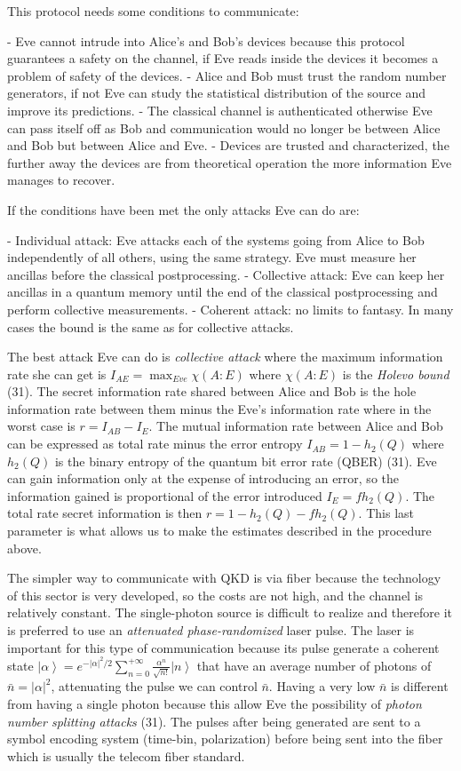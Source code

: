 This protocol needs some conditions to communicate:

- Eve cannot intrude into Alice’s and Bob’s devices because this protocol guarantees a safety on the channel, if Eve reads inside the devices it becomes a problem of safety of the devices.
- Alice and Bob must trust the random number generators, if not Eve can study the statistical distribution of the source and improve its predictions.
- The classical channel is authenticated otherwise Eve can pass itself off as Bob and  communication would no longer be between Alice and Bob but between Alice and Eve.
- Devices are trusted and characterized, the further away the devices are from theoretical operation the more information Eve manages to recover.

If the conditions have been met the only attacks Eve can do are:

- Individual attack: Eve attacks each of the systems going from Alice to Bob independently of all others, using the same strategy. Eve must measure her ancillas before the classical postprocessing.
- Collective attack: Eve can keep her ancillas in a quantum memory until the end of the classical postprocessing and perform collective measurements.
- Coherent attack: no limits to fantasy. In many cases the bound is the same as for collective attacks.

The best attack Eve can do is \textit{collective attack} where the maximum information rate she can get is  $I_{AE} = \max_{Eve} \chi(A:E)$ where $\chi(A:E)$ is the \textit{Holevo bound} (31).  The secret information rate shared between Alice and Bob is the hole information rate between them minus the Eve's information rate where in the worst case is $r = I_{AB} - I_{E}$. The mutual information rate between Alice and Bob can be expressed as total rate minus the error entropy $I_{AB} = 1 - h_2(Q)$ where $h_2(Q)$ is the binary entropy of the quantum bit error rate (QBER) (31). Eve can gain information only at the expense of introducing an error, so the information gained is proportional of the error introduced $I_E = f h_2(Q)$. The total rate secret information is then $r = 1 - h_2(Q) - f h_2(Q)$. This last parameter is what allows us to make the estimates described in the procedure above.


The simpler way to communicate with QKD is via fiber because the technology of this sector is very developed, so the costs are not high, and the channel is relatively constant. The single-photon source is difficult to realize and therefore it is preferred to use an \textit{attenuated phase-randomized} laser pulse. The laser is important for this type of communication because its pulse generate a coherent state $\left|\alpha\right> = e^{- |\alpha|^2 / 2} \sum_{n=0}^{+\infty} \frac{\alpha^n}{\sqrt{n!}} \left|n\right>$ that have an average number of photons of $\bar{n} = |\alpha|^2$, attenuating the pulse we can control $\bar{n}$. Having a very low $\bar{n}$ is different from having a single photon because this allow Eve the possibility of \textit{photon number splitting attacks} (31). The pulses after being generated are sent to a symbol encoding system (time-bin, polarization) before being sent into the fiber which is usually the telecom fiber standard.

